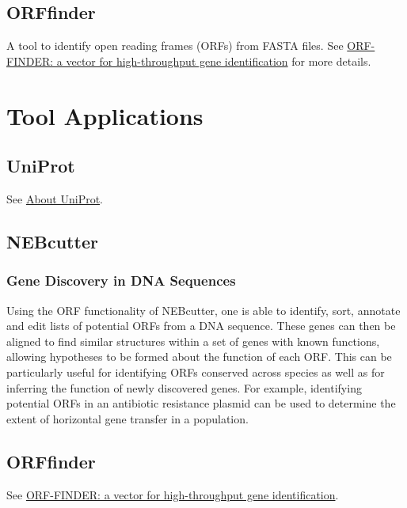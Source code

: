     \autocite{B12}

    \subsection{ORFfinder}

    A tool to identify open reading frames (ORFs) from FASTA files. See \href{https://doi.org/10.1016/S0378-1119(01)00819-8}{ORF-FINDER: a vector for high-throughput gene identification} for more details.

\section{Tool Applications}

\subsection{UniProt}

See \href{https://www.uniprot.org/help/about}{About UniProt}.

\subsection{NEBcutter}

    \subsubsection{Gene Discovery in DNA Sequences}

    Using the ORF functionality of NEBcutter, one is able to identify, sort, annotate and edit lists of potential ORFs from a DNA sequence.\autocite{L6} These genes can then be aligned to find similar structures within a set of genes with known functions, allowing hypotheses to be formed about the function of each ORF.\autocite{L6} This can be particularly useful for identifying ORFs conserved across species as well as for inferring the function of newly discovered genes. For example, identifying potential ORFs in an antibiotic resistance plasmid can be used to determine the extent of horizontal gene transfer in a population.\autocite{L6}

\subsection{ORFfinder}

See \href{https://doi.org/10.1016/S0378-1119(01)00819-8}{ORF-FINDER: a vector for high-throughput gene identification}.